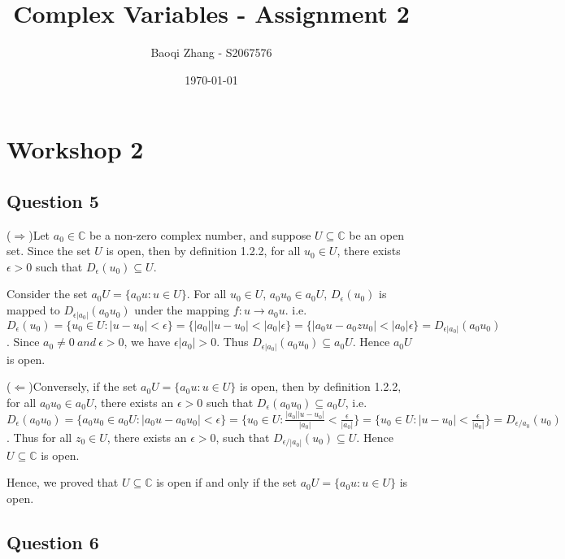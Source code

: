 \documentclass[11pt, oneside]{article}   	%
\title{Complex Variables - Assignment 2}
\author{Baoqi Zhang - S2067576}
\date{\today}							%
\begin{document}
\maketitle

\section*{Workshop 2}

\subsection*{Question 5}

(\(\Rightarrow\))Let \(a_0 \in \mathbb{C}\) be a non-zero complex number, and suppose \(U\subseteq \mathbb{C}\) be an open set. Since the set \(U\) is open, then by definition 1.2.2, for all \(u_0 \in U\),	there exists \(\epsilon > 0\) such that \(D_{\epsilon}(u_0) \subseteq U\).

Consider the set \(a_0U = \{a_0u: u\in U\}\). For all \(u_0\in U\),  \(a_0u_0 \in a_0U\), \(D_{\epsilon}(u_0)\) is mapped to \(D_{\epsilon|a_0| }(a_0u_0)\) under the mapping \(f:u\rightarrow a_0u\). i.e. \(D_{\epsilon}(u_0) = \{u_0\in U:|u-u_0|<\epsilon\}= \{|a_0||u-u_0|<|a_0|\epsilon\}= \{|a_0u-a_0zu_0|<|a_0|\epsilon\}=D_{\epsilon|a_0|}(a_0u_0)\). Since \(a_0 \not= 0 \ and \ \epsilon>0\), we have \(\epsilon|a_0| > 0 \). Thus \(D_{\epsilon|a_0|}(a_0u_0) \subseteq a_0U\). Hence \(a_0U\) is open.

(\(\Leftarrow\))Conversely, if the set \(a_0U = \{a_0u: u\in U\}\) is open, then by definition 1.2.2, for all \(a_0u_0 \in a_0U\), there exists an \(\epsilon >0\) such that \(D_{ \epsilon}(a_0u_0) \subseteq a_0U\), i.e. \(D_{\epsilon}(a_0u_0) = \{a_0u_0\in a_0U:|a_0u-a_0u_0|<\epsilon\}= \{u_0 \in U:\frac{|a_0||u-u_0|}{|a_0|}<\frac{\epsilon}{|a_0|}\}= \{u_0 \in U:|u-u_0|<\frac{\epsilon}{|a_0|}\}=D_{\epsilon/a_0}(u_0)\). Thus for all \(z_0 \in U\), there exists an \(\epsilon>0\),  such that \(D_{\epsilon/|a_0|}(u_0) \subseteq U\). Hence \(U \subseteq \mathbb{C}\) is open.

Hence,  we proved that \(U \subseteq \mathbb{C}\) is open if and only if the set \(a_0U = \{a_0u: u\in U\}\) is open.



\newpage

\subsection*{Question 6}
\end{document}

